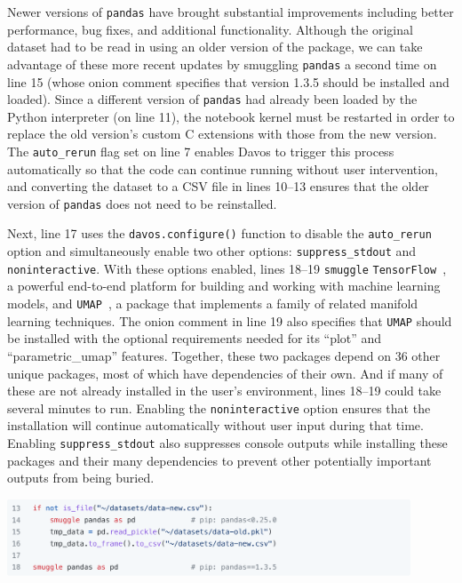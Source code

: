 \documentclass[preprint,12pt,a4paper]{elsarticle}
\begin{document}
Newer versions of \texttt{pandas} have brought substantial improvements
including better performance, bug fixes, and additional functionality. Although
the original dataset had to be read in using an older version of the package,
we can take advantage of these more recent updates by smuggling \texttt{pandas}
a second time on line 15 (whose onion comment specifies that version 1.3.5
should be installed and loaded). Since a different version of \texttt{pandas}
had already been loaded by the Python interpreter (on line 11), the notebook
kernel must be restarted in order to replace the old version's custom C
extensions with those from the new version. The \texttt{auto\_rerun} flag set
on line 7 enables Davos to trigger this process automatically so that
the code can continue running without user intervention, and converting the
dataset to a CSV file in lines 10--13 ensures that the older version of
\texttt{pandas} does not need to be reinstalled.

Next, line 17 uses the \texttt{davos.configure()} function to disable
the \texttt{auto\_rerun} option and simultaneously enable two other
options: \texttt{suppress\_stdout} and \texttt{noninteractive}. With
these options enabled, lines 18--19 \texttt{smuggle}
\texttt{TensorFlow}~\cite{AbadEtal15}, a powerful end-to-end platform
for building and working with machine learning models, and
\texttt{UMAP}~\cite{McInEtal18}, a package that implements a family
of related manifold learning techniques. The onion comment in line 19
also specifies that \texttt{UMAP} should be installed with the
optional requirements needed for its ``plot'' and ``parametric\_umap''
features. Together, these two packages depend on 36 other unique
packages, most of which have dependencies of their own. And if many of
these are not already installed in the user's environment, lines
18--19 could take several minutes to run.  Enabling the
\texttt{noninteractive} option ensures that the installation will
continue automatically without user input during that time.  Enabling
\texttt{suppress\_stdout} also suppresses console outputs while installing
these packages and their many dependencies to prevent other potentially important outputs from being buried.
\begin{center}
\includegraphics[width=0.9\textwidth]{figs/example4}
\end{center}
\end{document}
